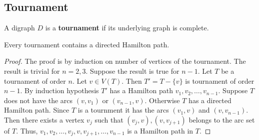 \subsection{Tournament}
\begin{definition}
	A digraph $D$ is a \textbf{tournament} if its underlying graph is complete.
\end{definition}

\begin{theorem}[R\'edei]
	Every tournament contains a directed Hamilton path.
\end{theorem}
\begin{proof}
	The proof is by induction on number of vertices of the tournament. The result is trivial for $n = 2,3$. Suppose the result is true for $n-1$. Let $T$ be a tournament of order $n$. Let $v \in V(T)$. Then $T'=T-\{v\}$ is tournament of order $n-1$. By induction hypothesis $T'$ has a Hamilton path $v_1,v_2,\dots,v_{n-1}$. Suppose $T$ does not have the arcs $(v,v_1)$ or $(v_{n-1},v)$. Otherwise $T$ has a directed Hamilton path. Since $T$ is a tournment it has the arcs $(v_1,v)$ and $(v,v_{n-1})$.\\

	Then there exists a vertex $v_j$ such that $(v_j,v),(v,v_{j+1})$ belongs to the arc set of $T$. Thus, $v_1,v_2,\dots,v_j,v,v_{j+1},\dots,v_{n-1}$ is a Hamilton path in $T$.
\end{proof}

